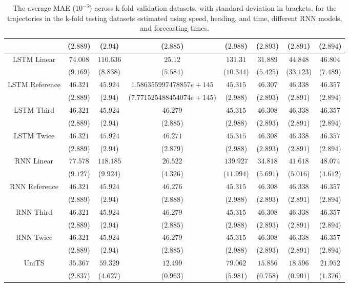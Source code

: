 \begin{table}[!ht]
{\begin{tabular}{|c|c|c|c|c|c|c|c|}
			 & ($2.889$) & ($2.94$) & ($2.885$) & ($2.988$) & ($2.893$) & ($2.891$) & ($2.894$) \\ \hline
			\multirow{2}{*}{LSTM Linear} & $74.008$ & $110.636$ & $25.12$ & $131.31$ & $31.889$ & $44.848$ & $46.804$ \\
			 & ($9.169$) & ($8.838$) & ($5.584$) & ($10.344$) & ($5.425$) & ($33.123$) & ($7.489$) \\ \hline
			\multirow{2}{*}{LSTM Reference} & $46.321$ & $45.924$ & $1.586355997478857e+145$ & $45.315$ & $46.307$ & $46.338$ & $46.357$ \\
			 & ($2.889$) & ($2.94$) & ($7.771525488454074e+145$) & ($2.988$) & ($2.893$) & ($2.891$) & ($2.894$) \\ \hline
			\multirow{2}{*}{LSTM Third} & $46.321$ & $45.924$ & $46.279$ & $45.315$ & $46.308$ & $46.338$ & $46.357$ \\
			 & ($2.889$) & ($2.94$) & ($2.885$) & ($2.988$) & ($2.893$) & ($2.891$) & ($2.894$) \\ \hline
			\multirow{2}{*}{LSTM Twice} & $46.321$ & $45.924$ & $46.271$ & $45.315$ & $46.308$ & $46.338$ & $46.357$ \\
			 & ($2.889$) & ($2.94$) & ($2.879$) & ($2.988$) & ($2.893$) & ($2.891$) & ($2.894$) \\ \hline
			\multirow{2}{*}{RNN Linear} & $77.578$ & $118.185$ & $26.522$ & $139.927$ & $34.818$ & $41.618$ & $48.074$ \\
			 & ($9.127$) & ($9.924$) & ($4.326$) & ($11.994$) & ($5.691$) & ($5.016$) & ($4.612$) \\ \hline
			\multirow{2}{*}{RNN Reference} & $46.321$ & $45.924$ & $46.276$ & $45.315$ & $46.308$ & $46.338$ & $46.357$ \\
			 & ($2.889$) & ($2.94$) & ($2.888$) & ($2.988$) & ($2.893$) & ($2.891$) & ($2.894$) \\ \hline
			\multirow{2}{*}{RNN Third} & $46.321$ & $45.924$ & $46.279$ & $45.315$ & $46.308$ & $46.338$ & $46.357$ \\
			 & ($2.889$) & ($2.94$) & ($2.885$) & ($2.988$) & ($2.893$) & ($2.891$) & ($2.894$) \\ \hline
			\multirow{2}{*}{RNN Twice} & $46.321$ & $45.924$ & $46.279$ & $45.315$ & $46.308$ & $46.338$ & $46.357$ \\
			 & ($2.889$) & ($2.94$) & ($2.885$) & ($2.988$) & ($2.893$) & ($2.891$) & ($2.894$) \\ \hline
			\multirow{2}{*}{UniTS} & $35.367$ & $59.329$ & $12.499$ & $79.062$ & $15.856$ & $18.596$ & $21.952$ \\
			 & ($2.837$) & ($4.627$) & ($0.963$) & ($5.981$) & ($0.758$) & ($0.901$) & ($1.376$) \\ \hline
		\end{tabular}
	}
	\caption{The average MAE ($10^{-3}$) across k-fold validation datasets, with standard deviation in brackets, for the trajectories in the k-fold testing datasets estimated using speed, heading, and time, different RNN models, and forecasting times.}
	\label{tab:all_speed_actual_dir_MAE}
\end{table}

